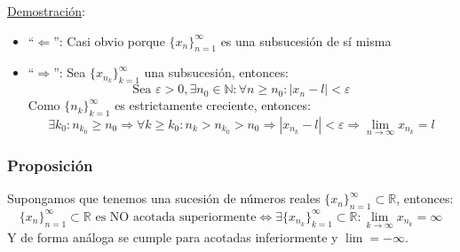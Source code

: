 \documentclass[10pt,a4paper,openright]{book}
\begin{document}
\underline{Demostración}:
\begin{itemize}
\item ``$\Leftarrow$'':
	Casi obvio porque $\{x_n\}_{n=1}^\infty$ es una subsucesión de sí misma
	
\item ``$\Rightarrow$'':
	Sea $\{x_{n_k}\}_{k=1}^\infty$ una subsucesión, entonces:
	$$\mbox{Sea }\varepsilon>0, \exists n_0\in \mathbb N: \forall n\geq n_0: \left|x_n-l\right|<\varepsilon$$
	Como $\{n_k\}_{k=1}^\infty$ es estrictamente creciente, entonces:
	$$\exists k_0: n_{k_0}\geq n_0\Rightarrow \forall k\geq k_0: n_k>n_{k_0}>n_0\Rightarrow \left|x_{n_k}-l\right|<\varepsilon\Rightarrow \lim_{n\rightarrow \infty} x_{n_k}=l$$
\end{itemize}

\subsubsection*{Proposición}
Supongamos que tenemos una sucesión de números reales $\{x_n\}_{n=1}^\infty\subset \mathbb R$, entonces:
$$\{x_n\}_{n=1}^\infty\subset \mathbb R\mbox{ es NO acotada superiormente}\Leftrightarrow \exists \{x_{n_k}\}_{k=1}^\infty\subset \mathbb R: \lim_{k\rightarrow \infty} x_{n_k}=\infty$$
Y de forma análoga se cumple para acotadas inferiormente y $\lim=-\infty$.\par
\end{document}
